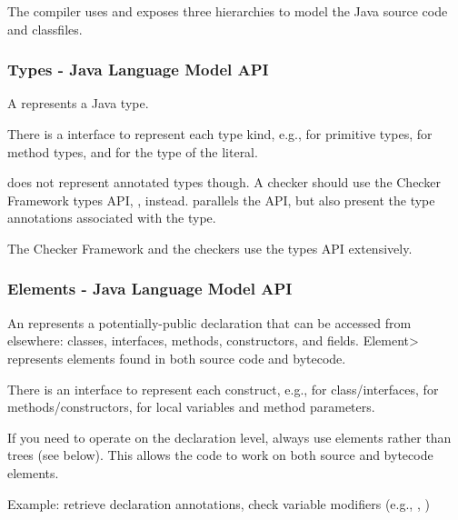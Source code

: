 The compiler uses and exposes three hierarchies to model the Java
source code and classfiles.


\subsubsection{Types - Java Language Model API\label{javac-types}}

A  represents a Java type.

\begin{sloppypar}
There is a  interface to represent each type kind,
e.g.,  for primitive types, 
for method types, and  for the type of the  literal.
\end{sloppypar}

 does not represent annotated types though.  A checker
should use the Checker Framework types API,
, instead.  
parallels the  API, but also present the type annotations
associated with the type.

The Checker Framework and the checkers use the types API extensively.


\subsubsection{Elements - Java Language Model API\label{javac-elements}}

An  represents a potentially-public
declaration that can be accessed from elsewhere:  classes, interfaces, methods, constructors, and
fields.  \<Element> represents elements found in both source
code and bytecode.

There is an  interface to represent each construct, e.g.,
 for class/interfaces,  for
methods/constructors,  for local variables and
method parameters.

If you need to operate on the declaration level, always use elements rather
than trees
(see below).  This allows the code to work on
both source and bytecode elements.

Example: retrieve declaration annotations, check variable
modifiers (e.g., , )


